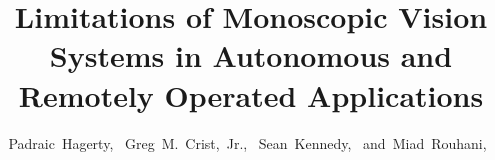 \documentclass[12pt, journal]{IEEEtran}
\begin{document}
%
\title{Limitations of Monoscopic Vision Systems in Autonomous and Remotely Operated Applications}

%
%
%

\author{Padraic~Hagerty,~
        Greg~M.~Crist,~Jr.,~
        Sean~Kennedy,~
        and~Miad~Rouhani,~%
}

% 
%
\end{document}
